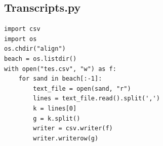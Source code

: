 \documentclass[a4paper]{article}
\begin{document}
\subsection{Transcripts.py}
\label{Transcripts.py}
\begin{lstlisting}[style=myPythonstyle]
import csv
import os
os.chdir("align")
beach = os.listdir()
with open("tes.csv", "w") as f:
	for sand in beach[:-1]:
		text_file = open(sand, "r")
		lines = text_file.read().split(',')
		k = lines[0]
		g = k.split()
		writer = csv.writer(f)
		writer.writerow(g)
\end{lstlisting}
\end{document}

